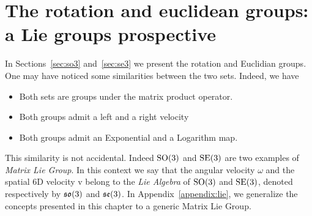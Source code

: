 \section{The rotation and euclidean groups: a Lie groups prospective~\label{sec:lie-crash}}

In Sections~\ref{sec:so3} and~\ref{sec:se3} we present the rotation and Euclidian groups. One may have noticed some similarities between the two sets. Indeed, we have
\begin{itemize}
    \item Both sets are groups under the matrix product operator.
    \item Both groups admit a left and a right velocity
    \item Both groups admit an Exponential and a Logarithm map.
\end{itemize}
\par
This similarity is not accidental. Indeed $\mathrm{SO}(3)$ and ${\mathrm{SE}}(3)$ are two examples of \emph{Matrix Lie Group}.
In this context we say that the angular velocity $\omega$ and the spatial 6D velocity $\mathrm{v}$ belong to the \emph{Lie Algebra} of $\mathrm{SO}(3)$ and ${\mathrm{SE}}(3)$, denoted respectively by $\mathfrak{so}(3)$ and $\mathfrak{se}(3)$.
In Appendix~\ref{appendix:lie}, we generalize the concepts presented in this chapter to a generic Matrix Lie Group.
